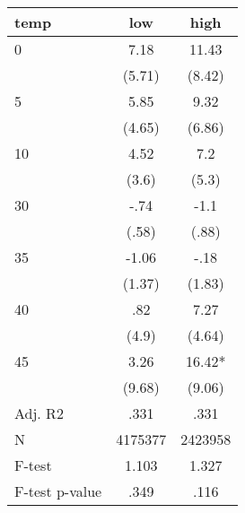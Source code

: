 \documentclass[]{article}
\begin{document}
\begin{tabular}{lcc} \hline
temp & low & high \\ \hline
0 & 7.18 & 11.43 \\
 & (5.71) & (8.42) \\
5 & 5.85 & 9.32 \\
 & (4.65) & (6.86) \\
10 & 4.52 & 7.2 \\
 & (3.6) & (5.3) \\
30 & -.74 & -1.1 \\
 & (.58) & (.88) \\
35 & -1.06 & -.18 \\
 & (1.37) & (1.83) \\
40 & .82 & 7.27 \\
 & (4.9) & (4.64) \\
45 & 3.26 & 16.42* \\
 & (9.68) & (9.06) \\
\hline Adj. R2 & .331 & .331 \\
N & 4175377 & 2423958 \\
F-test & 1.103 & 1.327 \\
 F-test p-value & .349 & .116 \\ \hline
\end{tabular}
\end{document}
